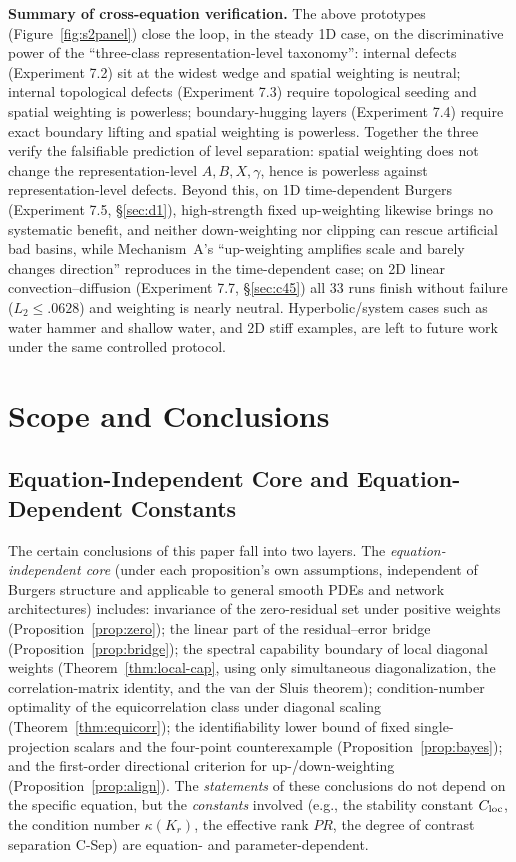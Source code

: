 \documentclass[11pt]{article}
\numberwithin{equation}{section}
\begin{document}
\noindent\textbf{Summary of cross-equation verification.} The above prototypes (Figure~\ref{fig:s2panel}) close the loop, in the steady 1D case, on the discriminative power of the ``three-class representation-level taxonomy'': internal defects (Experiment 7.2) sit at the widest wedge and spatial weighting is neutral; internal topological defects (Experiment 7.3) require topological seeding and spatial weighting is powerless; boundary-hugging layers (Experiment 7.4) require exact boundary lifting and spatial weighting is powerless. Together the three verify the falsifiable prediction of level separation: spatial weighting does not change the representation-level $A,B,X,\gamma$, hence is powerless against representation-level defects. Beyond this, on 1D time-dependent Burgers (Experiment 7.5, \S\ref{sec:d1}), high-strength fixed up-weighting likewise brings no systematic benefit, and neither down-weighting nor clipping can rescue artificial bad basins, while Mechanism~A's ``up-weighting amplifies scale and barely changes direction'' reproduces in the time-dependent case; on 2D linear convection--diffusion (Experiment 7.7, \S\ref{sec:c45}) all $33$ runs finish without failure ($L_2\le.0628$) and weighting is nearly neutral. Hyperbolic/system cases such as water hammer and shallow water, and 2D stiff examples, are left to future work under the same controlled protocol.

\FloatBarrier

\section{Scope and Conclusions}\label{sec:conclusion}

\subsection{Equation-Independent Core and Equation-Dependent Constants}\label{sec:scope}

The certain conclusions of this paper fall into two layers. The \emph{equation-independent core} (under each proposition's own assumptions, independent of Burgers structure and applicable to general smooth PDEs and network architectures) includes: invariance of the zero-residual set under positive weights (Proposition~\ref{prop:zero}); the linear part of the residual--error bridge (Proposition~\ref{prop:bridge}); the spectral capability boundary of local diagonal weights (Theorem~\ref{thm:local-cap}, using only simultaneous diagonalization, the correlation-matrix identity, and the van der Sluis theorem); condition-number optimality of the equicorrelation class under diagonal scaling (Theorem~\ref{thm:equicorr}); the identifiability lower bound of fixed single-projection scalars and the four-point counterexample (Proposition~\ref{prop:bayes}); and the first-order directional criterion for up-/down-weighting (Proposition~\ref{prop:align}). The \emph{statements} of these conclusions do not depend on the specific equation, but the \emph{constants} involved (e.g., the stability constant $C_{\rm loc}$, the condition number $\kappa(K_r)$, the effective rank $PR$, the degree of contrast separation C-Sep) are equation- and parameter-dependent.
\end{document}
